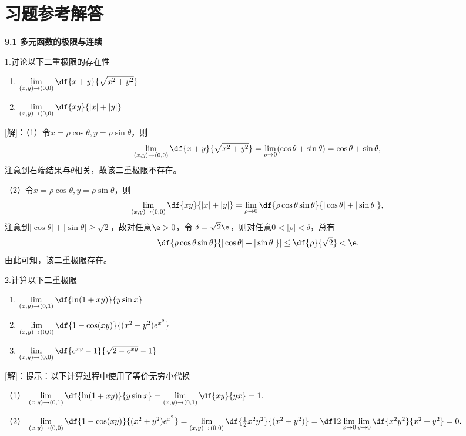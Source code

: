 \newpage

\section*{习题参考解答}

\begin{center}
	\bf 9.1 多元函数的极限与连续
\end{center}

1.讨论以下二重极限的存在性
\begin{enumerate}[(1)]
  	\setlength{\itemindent}{1cm}
    \item $\lim\limits_{(x,y)\to(0,0)}\df{x+y}{\sqrt{x^2+y^2}}$
    \item $\lim\limits_{(x,y)\to(0,0)}\df{xy}{|x|+|y|}$
  \end{enumerate}

[解]：（1）令$x=\rho\cos\theta,y=\rho\sin\theta$，则
$$\lim\limits_{(x,y)\to(0,0)}\df{x+y}{\sqrt{x^2+y^2}}
=\lim\limits_{\rho\to 0}(\cos\theta+\sin\theta)=\cos\theta+\sin\theta,$$
注意到右端结果与$\theta$相关，故该二重极限不存在。

（2）令$x=\rho\cos\theta,y=\rho\sin\theta$，则
$$\lim\limits_{(x,y)\to(0,0)}\df{xy}{|x|+|y|}
=\lim\limits_{\rho\to0}\df{\rho\cos\theta\sin\theta}{|\cos\theta|+|\sin\theta|},$$
注意到$|\cos\theta|+|\sin\theta|\geq\sqrt2$，故对任意$\e>0$，令
$\delta=\sqrt2\e$，则对任意$0<|\rho|<\delta$，总有
$$\left|\df{\rho\cos\theta\sin\theta}{|\cos\theta|+|\sin\theta|}\right|
\leq\df{\rho}{\sqrt2}<\e,$$
由此可知，该二重极限存在。\fin

2.计算以下二重极限
\begin{enumerate}[(1)]
    \setlength{\itemindent}{1cm}
    \item $\lim\limits_{(x,y)\to(0,1)}\df{\ln(1+xy)}{y\sin x}$
    \item $\lim\limits_{(x,y)\to(0,0)}\df{1-\cos(xy)}{(x^2+y^2)e^{x^2}}$
    \item $\lim\limits_{(x,y)\to(0,0)}\df{e^{xy}-1}{\sqrt{2-e^{xy}}-1}$
  \end{enumerate}

[解]：提示：以下计算过程中使用了等价无穷小代换

（1）
$\lim\limits_{(x,y)\to(0,1)}\df{\ln(1+xy)}{y\sin x}
=\lim\limits_{(x,y)\to(0,1)}\df{xy}{yx}=1.$

（2）
$\lim\limits_{(x,y)\to(0,0)}\df{1-\cos(xy)}{(x^2+y^2)e^{x^2}}
=\lim\limits_{(x,y)\to(0,0)}\df{\frac12x^2y^2}{(x^2+y^2)}
=\df12\lim\limits_{x\to 0}\lim\limits_{y\to0}\df{x^2y^2}{x^2+y^2}=0.$


